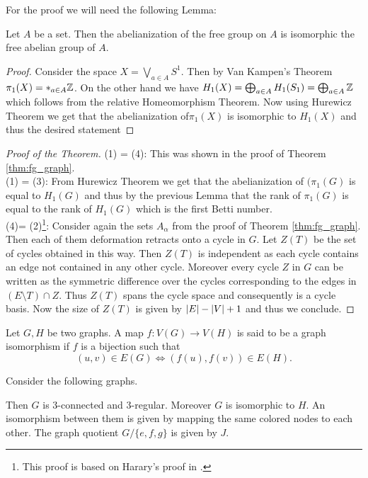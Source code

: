 For the proof we will need the following Lemma:
\begin{lemma}
	Let $A$ be a set. Then the abelianization of the free group on $A$ is isomorphic the free abelian group of $A$.
\end{lemma}

\begin{proof}
	Consider the space $X = \bigvee_{a \in A} S^{1}$. Then by Van Kampen's Theorem $\pi_1(X) = *_{a \in A} \mathbb{Z}$.
	On the other hand we have $H_1(X) = \bigoplus_{a \in A} H_1(S_1) = \bigoplus_{a \in A} \mathbb{Z}$ which follows from the relative Homeomorphism Theorem.
	Now using Hurewicz Theorem we get that the abelianization of$\pi_1(X)$ is isomorphic to $H_1(X)$ and thus the desired statement
\end{proof}

\begin{proof}[Proof of the Theorem]
	(1) = (4): This was shown in the proof of Theorem \ref{thm:fg_graph}.\\
	(1) = (3): From Hurewicz Theorem we get that the abelianization of $(\pi_{1}(G)$ is equal to $H_{1}(G)$
	and thus by the previous Lemma that the rank of $\pi_1(G)$ is equal to the rank of $H_1(G)$ which is the first Betti number.\\
	(4)= (2)\footnote{This proof is based on Harary's proof in \cite[p. 37-40]{harary69}.}:
		Consider again the sets $A_{\alpha}$ from the proof of Theorem \ref{thm:fg_graph}. Then each of them deformation retracts onto a cycle in $G$.
	Let $Z(T)$ be the set of cycles obtained in this way. Then  $Z(T)$ is independent as each cycle contains an edge not contained in any other cycle.
	Moreover every cycle $Z$ in $G$ can be written as the symmetric difference over the cycles corresponding to the edges in $(E \setminus T) \cap Z$.
	Thus $Z(T)$ spans the cycle space and consequently is a cycle basis. Now the size of $Z(T)$ is given by $\abs{E} - \abs{V} + 1$ and thus we conclude.
\end{proof}

\begin{definition}
	Let $G,H$ be two graphs. A map $f: V(G) \to V(H)$ is said to be a graph isomorphism if $f$ is a bijection such that
	\[
		(u,v) \in E(G) \Leftrightarrow (f(u),f(v)) \in E(H)
	.\] 
\end{definition}

\begin{eg}\label{ex:gAuto}
	Consider the following graphs.

	Then $G$ is $3$-connected and $3$-regular. Moreover $G$ is isomorphic to $H$.
	An isomorphism between them is given by mapping the same colored nodes to each other.
	The graph quotient $G / \{e,f,g\}$ is given by $J$.
\end{eg}

